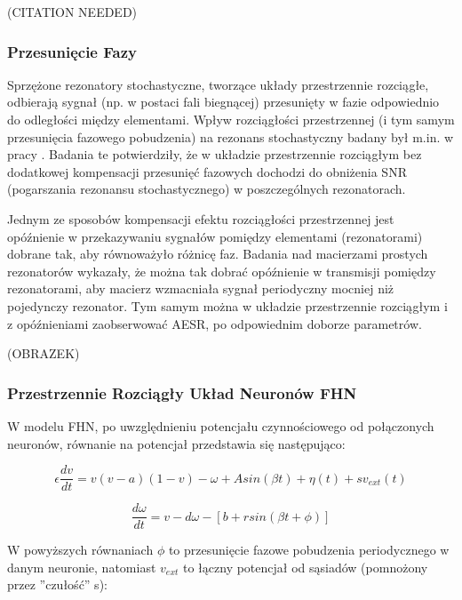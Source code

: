   (CITATION NEEDED)

  \subsubsection{Przesunięcie Fazy}
  \label{sec:przesuniecie_fazy}

  Sprzężone rezonatory stochastyczne, tworzące układy przestrzennie rozciągłe, odbierają sygnał (np. w postaci fali biegnącej) przesunięty w fazie odpowiednio do odległości między elementami. Wpływ rozciągłości przestrzennej (i tym samym przesunięcia fazowego pobudzenia) na rezonans stochastyczny badany był m.in. w pracy \cite{ijmpb_14_8}. Badania te potwierdziły, że w układzie przestrzennie rozciągłym bez dodatkowej kompensacji przesunięć fazowych dochodzi do obniżenia SNR (pogarszania rezonansu stochastycznego) w poszczególnych rezonatorach.

  Jednym ze sposobów kompensacji efektu rozciągłości przestrzennej jest opóźnienie w przekazywaniu sygnałów pomiędzy elementami (rezonatorami) dobrane tak, aby równoważyło różnicę faz. Badania nad macierzami prostych rezonatorów \cite{ijmpb_23_2} wykazały, że można tak dobrać opóźnienie w transmisji pomiędzy rezonatorami, aby macierz wzmacniała sygnał periodyczny mocniej niż pojedynczy rezonator. Tym samym można w układzie przestrzennie rozciągłym i z opóźnieniami zaobserwować AESR, po odpowiednim doborze parametrów.

  (OBRAZEK)

  \subsubsection{Przestrzennie Rozciągły Układ Neuronów FHN}
  \label{sec:przesuniecie_fazy}

  W modelu FHN, po uwzględnieniu potencjału czynnościowego od połączonych neuronów, równanie na potencjał przedstawia się następująco:

  \begin{equation} \label{eq:v2}
    \epsilon \frac{dv}{dt} = v(v-a)(1-v)- \omega + A sin(\beta t) + \eta(t) + sv_{ext}(t)
  \end{equation}

  \begin{equation} \label{eq:w2}
    \frac{d \omega}{dt} = v - d \omega - [b + r sin(\beta t + \phi)]
  \end{equation}

  W powyższych równaniach $\phi$ to przesunięcie fazowe pobudzenia periodycznego w danym neuronie, natomiast $v_{ext}$ to łączny potencjał od sąsiadów (pomnożony przez ''czułość'' s):

